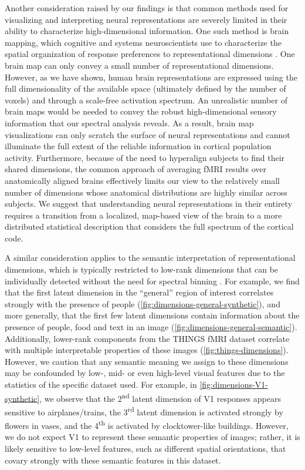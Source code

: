 \documentclass[10pt]{article}
\begin{document}
Another consideration raised by our findings is that common methods used for visualizing and interpreting neural representations are severely limited in their ability to characterize high-dimensional information. One such method is brain mapping, which cognitive and systems neuroscientists use to characterize the spatial organization of response preferences to representational dimensions \autocite{Huth2012,Bao2020,Tarhan2020,Hebart2023,Contier2024}. One brain map can only convey a small number of representational dimensions. However, as we have shown, human brain representations are expressed using the full dimensionality of the available space (ultimately defined by the number of voxels) and through a scale-free activation spectrum. An unrealistic number of brain maps would be needed to convey the robust high-dimensional sensory information that our spectral analysis reveals. As a result, brain map visualizations can only scratch the surface of neural representations and cannot illuminate the full extent of the reliable information in cortical population activity. Furthermore, because of the need to hyperalign subjects to find their shared dimensions, the common approach of averaging fMRI results over anatomically aligned brains effectively limits our view to the relatively small number of dimensions whose anatomical distributions are highly similar across subjects. We suggest that understanding neural representations in their entirety requires a transition from a localized, map-based view of the brain to a more distributed statistical description that considers the full spectrum of the cortical code.

A similar consideration applies to the semantic interpretation of representational dimensions, which is typically restricted to low-rank dimensions that can be individually detected without the need for spectral binning \autocite{Huth2012,Khosla2022,Tarhan2020,Hebart2023}. For example, we find that the first latent dimension in the ``general'' region of interest correlates strongly with the presence of people (\ref{fig:dimensions-general-synthetic}), and more generally, that the first few latent dimensions contain information about the presence of people, food and text in an image (\ref{fig:dimensions-general-semantic}). Additionally, lower-rank components from the THINGS fMRI dataset correlate with multiple interpretable properties of these images (\ref{fig:things-dimensions}). However, we caution that any semantic meaning we assign to these dimensions may be confounded by low-, mid- or even high-level visual features due to the statistics of the specific dataset used. For example, in \ref{fig:dimensions-V1-synthetic}, we observe that the 2\textsuperscript{nd} latent dimension of V1 responses appears sensitive to airplanes/trains, the 3\textsuperscript{rd} latent dimension is activated strongly by flowers in vases, and the 4\textsuperscript{th} is activated by clocktower-like buildings. However, we do not expect V1 to represent these semantic properties of images; rather, it is likely sensitive to low-level features, such as different spatial orientations, that covary strongly with these semantic features in this dataset.
\end{document}
